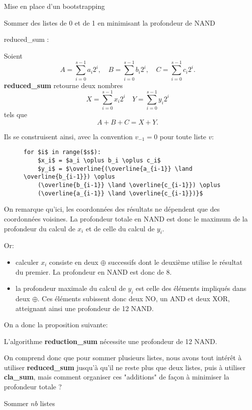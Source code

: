 \begin{section}{Mise en place d'un bootstrapping}
\begin{subsection}{Sommer des listes de 0 et de 1 en minimisant la profondeur de NAND}
\begin{subsubsection}{reduced\_sum :}

	Soient
\[A = \sum_{i=0}^{s-1} a_i 2^i, \quad B = \sum_{i=0}^{s-1} b_i 2^i, \quad C = \sum_{i=0}^{s-1} c_i 2^i. \]
\textbf{reduced\_sum} retourne deux nombres 
\[X = \sum_{i=0}^{s-1} x_i 2^i \quad Y = \sum_{i=0}^{s-1} y_i 2^i \] 
tels que 
\[A + B + C = X + Y.\]

Ils se construisent ainsi, avec la convention $v_{-1} = 0 $ pour toute liste $v$:
\begin{figure}[!h]
\begin{lstlisting}
for $i$ in range($s$):
	$x_i$ = $a_i \oplus b_i \oplus c_i$
	$y_i$ = $\overline{(\overline{a_{i-1}} \land \overline{b_{i-1}}) \oplus
	(\overline{b_{i-1}} \land \overline{c_{i-1}}) \oplus
	(\overline{a_{i-1}} \land \overline{c_{i-1}})}$
\end{lstlisting}
\end{figure}

	On remarque qu'ici, les coordonnées des résultats ne dépendent que des coordonnées voisines. La profondeur
	totale en NAND est donc le maximum de la profondeur du calcul de $x_i$ et de celle du calcul de $y_i$.

Or:
\begin{itemize}
\item calculer $x_i$ consiste en deux $\oplus$ successifs dont le deuxième utilise le résultat du premier. La profondeur en NAND est donc de 8. 
\item la profondeur maximale du calcul de $y_i$ est celle des éléments impliqués dans deux \nolinebreak
$\oplus$. Ces éléments subissent donc deux NO, un AND et deux XOR, atteignant ainsi une profondeur de 12 NAND.
\end{itemize}

On a donc la proposition suivante:
\begin{prop}
\label{reduction_sum}
	L'algorithme \textbf{reduction\_sum} nécessite une profondeur de 12 NAND.
\end{prop}

On comprend donc que pour sommer plusieurs listes, nous avons tout
intérêt à utiliser \textbf{reduced\_sum} jusqu'à qu'il ne reste plus
que deux listes, puis à utiliser \textbf{cla\_sum}, mais comment organiser ces "additions" de façon à minimiser la profondeur totale ?

\end{subsubsection}
\begin{subsubsection}{Sommer $nb$ listes}
\label{sec:sum_lists}

\end{subsubsection}
\end{subsection}
\end{section}
